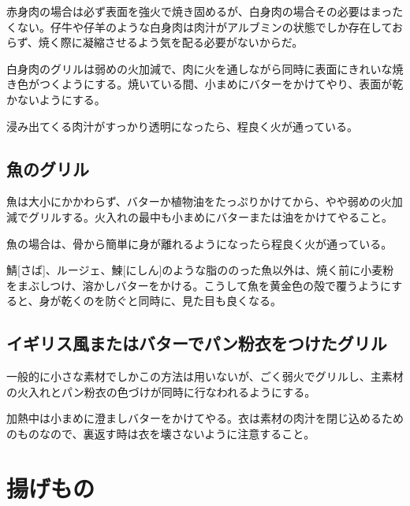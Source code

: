 赤身肉の場合は必ず表面を強火で焼き固めるが、白身肉の場合その必要はまったくない。仔牛や仔羊のような白身肉は肉汁がアルブミンの状態でしか存在しておらず、焼く際に凝縮させるよう気を配る必要がないからだ。

白身肉のグリルは弱めの火加減で、肉に火を通しながら同時に表面にきれいな焼き色がつくようにする。焼いている間、小まめにバターをかけてやり、表面が乾かないようにする。

浸み出てくる肉汁がすっかり透明になったら、程良く火が通っている。

\hypertarget{ux9b5aux306eux30b0ux30eaux30eb}{%
\subsection{魚のグリル}\label{ux9b5aux306eux30b0ux30eaux30eb}}

魚は大小にかかわらず、バターか植物油をたっぷりかけてから、やや弱めの火加減でグリルする。火入れの最中も小まめにバターまたは油をかけてやること。

魚の場合は、骨から簡単に身が離れるようになったら程良く火が通っている。

鯖{[}さば{]}、ルージェ、鰊{[}にしん{]}のような脂ののった魚以外は、焼く前に小麦粉をまぶしつけ、溶かしバターをかける。こうして魚を黄金色の殻で覆うようにすると、身が乾くのを防ぐと同時に、見た目も良くなる。

\hypertarget{ux30a4ux30aeux30eaux30b9ux98a8ux307eux305fux306fux30d0ux30bfux30fcux3067ux30d1ux30f3ux7c89ux8863ux3092ux3064ux3051ux305fux30b0ux30eaux30eb}{%
\subsection{イギリス風またはバターでパン粉衣をつけたグリル}\label{ux30a4ux30aeux30eaux30b9ux98a8ux307eux305fux306fux30d0ux30bfux30fcux3067ux30d1ux30f3ux7c89ux8863ux3092ux3064ux3051ux305fux30b0ux30eaux30eb}}

一般的に小さな素材でしかこの方法は用いないが、ごく弱火でグリルし、主素材の火入れとパン粉衣の色づけが同時に行なわれるようにする。

加熱中は小まめに澄ましバターをかけてやる。衣は素材の肉汁を閉じ込めるためのものなので、裏返す時は衣を壊さないように注意すること。

\hypertarget{ux63daux3052ux3082ux306e}{%
\section{揚げもの}\label{ux63daux3052ux3082ux306e}}
